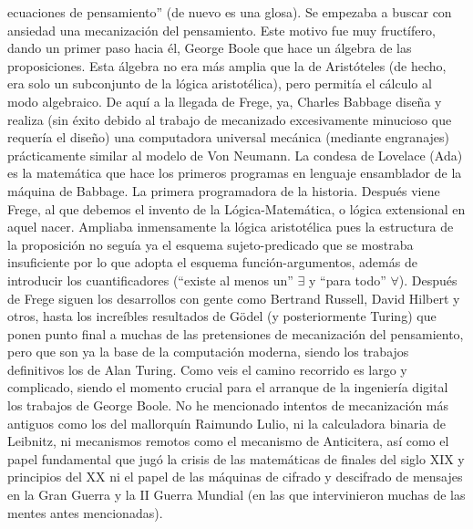 \documentclass[final,12pt,a4paper,twoside,fleqn]{extbook}
\theoremstyle{definition}
\theoremstyle{remark}
\begin{document}
ecuaciones de pensamiento” (de nuevo es una glosa). Se empezaba a buscar con
ansiedad una mecanización del pensamiento. Este motivo fue muy fructífero,
dando un primer paso hacia él, George Boole que hace un álgebra de las
proposiciones. Esta álgebra no era más amplia que la de Aristóteles (de
hecho, era solo un subconjunto de la lógica aristotélica), pero permitía el
cálculo al modo algebraico. De aquí a la llegada de Frege, ya, Charles
Babbage diseña y realiza (sin éxito debido al trabajo de mecanizado
excesivamente minucioso que requería el diseño) una computadora universal
mecánica (mediante engranajes) prácticamente similar al modelo de Von
Neumann. La condesa de Lovelace (Ada) es la matemática que hace los primeros
programas en lenguaje ensamblador de la máquina de Babbage. La primera
programadora de la historia. Después viene Frege, al que debemos el invento
de la Lógica-Matemática, o lógica extensional en aquel nacer. Ampliaba
inmensamente la lógica aristotélica pues la estructura de la proposición no
seguía ya el esquema sujeto-predicado que se mostraba insuficiente por lo que
adopta el esquema función-argumentos, además de introducir los
cuantificadores (“existe al menos un” \(\exists\) y “para todo” \(\forall\)).
Después de Frege siguen los desarrollos con gente como Bertrand Russell,
David Hilbert y otros, hasta los increíbles resultados de Gödel (y
posteriormente Turing) que ponen punto final a muchas de las pretensiones de
mecanización del pensamiento, pero que son ya la base de la computación
moderna, siendo los trabajos definitivos los de Alan Turing. Como veis el
camino recorrido es largo y complicado, siendo el momento crucial para el
arranque de la ingeniería digital los trabajos de George Boole. No he
mencionado intentos de mecanización más antiguos como los del mallorquín
Raimundo Lulio, ni la calculadora binaria de Leibnitz, ni mecanismos remotos
como el mecanismo de Anticitera, así como el papel fundamental que jugó la
crisis de las matemáticas de finales del siglo XIX y principios del XX ni el
papel de las máquinas de cifrado y descifrado de mensajes en la Gran Guerra y
la II Guerra Mundial (en las que intervinieron muchas de las mentes antes
mencionadas).
\end{document}
